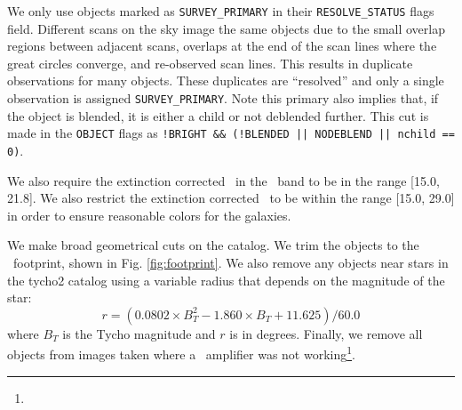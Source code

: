 \documentclass[preprint]{aastex}
\newcommand{\modelrmin}{15.0}
\newcommand{\modelrmax}{29.0}
\newcommand{\rmin}{15.0}
\newcommand{\rmax}{21.8}
\newcommand{\umax}{21.0}
\begin{document}
We only use objects marked as \texttt{SURVEY\_PRIMARY} in their
\texttt{RESOLVE\_STATUS} flags field. Different scans on the sky image the same
objects due to the small overlap regions between adjacent scans, overlaps at
the end of the scan lines where the great circles converge, and re-observed
scan lines.  This results in duplicate observations for many objects.  These
duplicates are ``resolved'' and only a single observation is assigned
\texttt{SURVEY\_PRIMARY}.  Note this primary also implies that, if the object
is blended, it is either a child or not deblended further.  This cut is made in
the \texttt{OBJECT} flags as \texttt{!BRIGHT \&\& (!BLENDED || NODEBLEND ||
nchild == 0)}.

We also require the extinction corrected \citep{Schlegel98} \cmodelmag\ in the
\rmag\ band to be in the range [\rmin, \rmax].   We also restrict the
extinction corrected \modelmag\ to be within the range [\modelrmin, \modelrmax]
in order to ensure reasonable colors for the galaxies.


We make broad geometrical cuts on the catalog.  We trim the objects to the
\boss\ footprint, shown in Fig. \ref{fig:footprint}. We also remove any
objects near stars in the tycho2 catalog \citep{tycho2} using a variable radius
that depends on the magnitude of the star:
\begin{equation}
r = (0.0802\times B_T^2 - 1.860\times B_T + 11.625)/60.0
\end{equation}
where $B_T$ is the Tycho magnitude and $r$ is in degrees.  Finally, we remove
all objects from images taken where a \umag\ amplifier was not working\footnote{\DRsevcaveat}.
\end{document}
